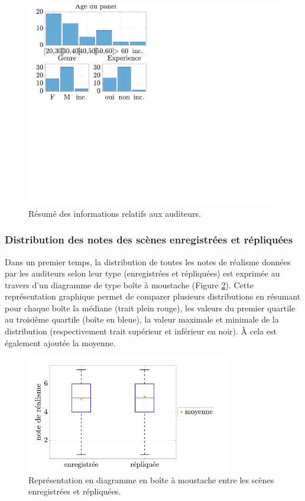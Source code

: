 {\begin{figure}[ht]
\centering
\includegraphics[width = .8\textwidth]{./figures/test_perceptif/testPerceptif_panel.pdf}
\caption{Résumé des informations relatifs aux auditeurs.}
\label{fig:panelTest}
\end{figure}



\subsubsection{Distribution des notes des scènes enregistrées et répliquées} 

Dans un premier temps, la distribution de toutes les notes de réalisme données par les auditeurs selon leur type (enregistrées et répliquées) est exprimée au travers d'un diagramme de type \og boîte à moustache \fg{} (Figure \ref{fig:ANOVA_scene}). Cette représentation graphique permet de comparer plusieurs distributions en résumant pour chaque boîte la médiane (trait plein rouge), les valeurs du  premier quartile au troisième quartile (boîte en bleue), la valeur maximale et minimale de la distribution (respectivement trait supérieur et inférieur en noir). \`A cela est également ajoutée la moyenne.\\

\begin{figure}[h]
\centering
\includegraphics[width = 0.8\textwidth]{./figures/test_perceptif/testPerceptif_boxplotType.pdf}
\caption{Représentation en diagramme en boîte à moustache entre les scènes enregistrées et répliquées.}\label{fig:ANOVA_scene}
\end{figure}

}
